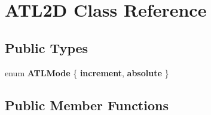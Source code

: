 \hypertarget{classATL2D}{}\section{A\+T\+L2D Class Reference}
\label{classATL2D}
\subsection*{Public Types}
\begin{DoxyCompactItemize}
\item 
\mbox{\label{classATL2D_a9da4a65fa21af08f0afcab8060ed43da}} 
enum {\bfseries A\+T\+L\+Mode} \{ {\bfseries increment}, 
{\bfseries absolute}
 \}
\end{DoxyCompactItemize}
\subsection*{Public Member Functions}
